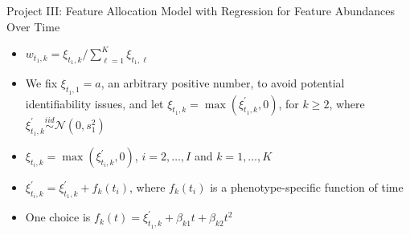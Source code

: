 \documentclass[ignorenonframetext,]{beamer}
\newcommand{\iid}{\overset{iid}{\sim}}
\newcommand{\N}{ \mathcal{N} }
\begin{document}
\begin{frame}{Project III: Feature Allocation Model with Regression for
Feature Abundances Over Time}
\begin{itemize}
  \setlength\itemsep{1em}
  \item $w_{t_1,k}= \xi_{t_1,k}/\sum_{\ell=1}^K \xi_{t_1, \ell}$
  \item  We fix $\xi_{t_1,1}=a$, an arbitrary positive number, to avoid
    potential identifiability issues, and let $\xi_{t_1,k} =
    \max(\xi^\prime_{t_1,k}, 0)$, for $k\ge 2$, where $\xi^\prime_{t_1,k} \iid
    \N(0, s^2_1)$
  \item $\xi_{t_i,k} = \max(\xi^\prime_{t_i,k}, 0)$, $i=2, \ldots, I$ and $k=1,
    \ldots, K$ 
  \item $\xi^\prime_{t_i,k} = \xi^\prime_{t_1, k} + f_k(t_i)$, where $f_k(t_i)$
    is a phenotype-specific function of time
  \item One choice is $f_k(t) = \xi^\prime_{t_1,k} + \beta_{k1}t + \beta_{k2}t^2$
\end{itemize}
\end{frame}


\end{document}
